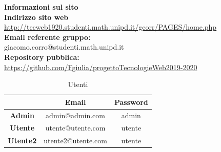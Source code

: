 \hspace{5pt}

\begin{center}
	\textbf{\Large{Informazioni sul sito}}\\
	\textbf{Indirizzo sito web} \\ \url{http://tecweb1920.studenti.math.unipd.it/gcorr/PAGES/home.php}\\
	\textbf{Email referente gruppo:} \\ giacomo.corro@studenti.math.unipd.it \\
	\textbf{Repository pubblica:} \\ \url{https://github.com/Fgiulia/progettoTecnologieWeb2019-2020}\\
	\renewcommand{\arraystretch}{1.8}
	\begin{longtable}[H]{c c c}
		\caption{Utenti}\\
		\rowcolor[HTML]{58c25d}
		\multicolumn{1}{c}{\color[HTML]{FFFFFF} \textbf{Utente}} &
		\multicolumn{1}{c}{\color[HTML]{FFFFFF} \textbf{Email}} &
		\multicolumn{1}{c}{\color[HTML]{FFFFFF} \textbf{Password}} \\
		\endhead
		\textbf{Admin} & admin@admin.com & admin\\
		\textbf{Utente} & utente@utente.com & utente\\
		\textbf{Utente2} & utente2@utente.com & utente\\
	\end{longtable}
\end{center}